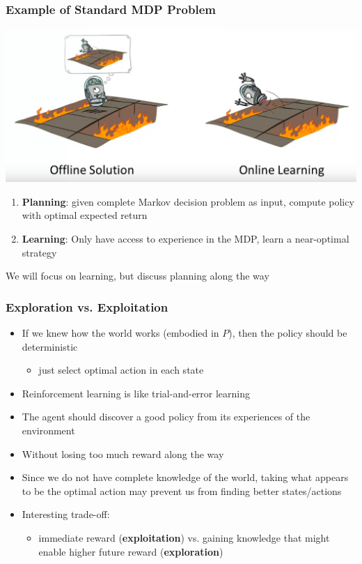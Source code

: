 \documentclass[handout]{beamer}
\renewcommand{\high}{\textbf}
\begin{document}
\begin{frame}\frametitle{Example of Standard MDP Problem}\small
\begin{center}
\includegraphics[width=0.785\linewidth,trim=0 50 0 0,clip]{Figures/rll4} 
\end{center}
\begin{enumerate}
\item  \high{Planning}: given complete Markov decision problem as input, compute policy with optimal expected return
\item \high{Learning}: Only have access to experience in the MDP, learn a near-optimal strategy
\end{enumerate}
We will focus on learning, but discuss planning along the way
\end{frame}

\begin{frame}\frametitle{Exploration vs. Exploitation}\small
\begin{itemize}
\item If we knew how the world works (embodied in $P$), then the policy should be deterministic 
\begin{itemize}
\item  just select optimal action in each state
\end{itemize}
\item Reinforcement learning is like trial-and-error learning
\item The agent should discover a good policy from its experiences of the environment
\item Without losing too much reward along the way

\item Since we do not have complete knowledge of the world, taking what appears to be the optimal action may prevent us from finding better states/actions
\item Interesting trade-off: 
\begin{itemize}
\item immediate reward (\high{exploitation}) vs. gaining knowledge that might enable higher future reward (\high{exploration})
\end{itemize}
\end{itemize}
\end{frame}
\end{document}
